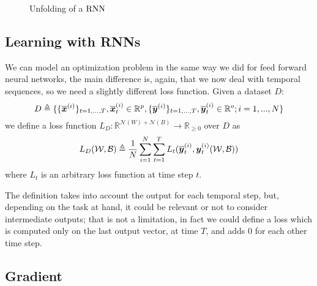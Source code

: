 \begin{figure}[h!]
\caption{Unfolding of a $\mathrm{RNN}$}
\label{rnn_unfolding}
\end{figure}


\subsection{Learning with RNNs}
We can model an optimization problem in the same way we did for feed forward neural networks, the main difference is, again, that we now deal with temporal sequences, so we need a slightly different loss function.
Given a dataset $D$:
\begin{equation}
D\triangleq\{\{\overline{\boldsymbol{x}}^{(i)}\}_{t=1,...,T}, \overline{\boldsymbol{x}}^{(i)}_t \in \mathbb{R}^p, \{\overline{\boldsymbol{y}}^{(i)}\}_{t=1,...,T}, \overline{\boldsymbol{y}}^{(i)}_t \in \mathbb{R}^o;  i=1,...,N\}
\end{equation}
we define a loss function $L_D:\mathbb{R}^{\mathcal{N}(W)+\mathcal{N}(B)} \rightarrow \mathbb{R}_{\geq 0}$ over $D$  as
\begin{equation}
L_D(\mathcal{W},\mathcal{B})\triangleq\frac{1}{N}\sum_{i=1}^N \sum_{t=1}^T L_t(\overline{\boldsymbol{y}}_t^{(i)},\boldsymbol{y}_t^{(i)}(\mathcal{W},\mathcal{B})) 
\end{equation}
where $L_t$ is an arbitrary loss function at time step $t$.

The definition takes into account the output for each temporal step, but, depending on the task at hand, it could be relevant or not to consider intermediate
outputs; that is not a limitation, in fact we could define a loss which is computed only on the last output vector, at time $T$, and adds 0 for each
other time step.

\subsection{Gradient}






